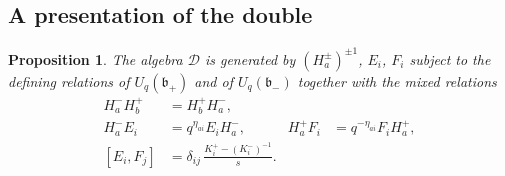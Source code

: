 \documentclass[11pt]{article}
\newtheorem{proposition}[theorem]{Proposition}
\theoremstyle{remark}
\newcommand{\U}{U_q}
\newcommand{\bp}{\mathfrak b_+}
\newcommand{\bm}{\mathfrak b_-}
\newcommand{\cD}{\mathcal D}
\begin{document}
\subsection{A presentation of the double}

\begin{proposition}\label{prop:double}
The algebra $\cD$ is generated by $(H^\pm_a)^{\pm1}$, $E_i$, $F_i$
subject to the defining relations of $\U(\bp)$ and of $\U(\bm)$ together
with the mixed relations
\begin{align}
 H^-_aH^+_b&=H^+_bH^-_a, \label{eq:doubletorus}\\
 H^-_aE_i&=q^{\eta_{ai}}E_iH^-_a,
       & H^+_aF_i&=q^{-\eta_{ai}}F_iH^+_a, \label{eq:doubleweights}\\
 [E_i,F_j]&=\delta_{ij}\,\frac{K^+_i-(K^-_i)^{-1}}s. \label{eq:doubleEF}
\end{align}
\end{proposition}
\end{document}
